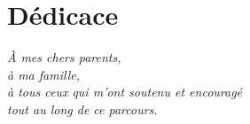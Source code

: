 \chapter*{Dédicace}
\thispagestyle{empty}

\vspace*{3cm}

\begin{center}
\textit{À mes chers parents,}\\[0.3cm]
\textit{à ma famille,}\\[0.3cm]
\textit{à tous ceux qui m'ont soutenu et encouragé}\\[0.3cm]
\textit{tout au long de ce parcours.}
\end{center}

\newpage
